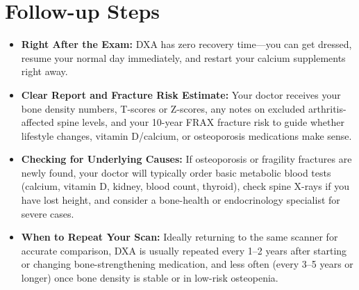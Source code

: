 \section{Follow-up Steps}
\begin{itemize}
\item \textbf{Right After the Exam:} DXA has zero recovery time---you can get dressed, resume your normal day immediately, and restart your calcium supplements right away.
\item \textbf{Clear Report and Fracture Risk Estimate:} Your doctor receives your bone density numbers, T-scores or Z-scores, any notes on excluded arthritis-affected spine levels, and your 10-year FRAX fracture risk to guide whether lifestyle changes, vitamin D/calcium, or osteoporosis medications make sense.
\item \textbf{Checking for Underlying Causes:} If osteoporosis or fragility fractures are newly found, your doctor will typically order basic metabolic blood tests (calcium, vitamin D, kidney, blood count, thyroid), check spine X-rays if you have lost height, and consider a bone-health or endocrinology specialist for severe cases.
\item \textbf{When to Repeat Your Scan:} Ideally returning to the same scanner for accurate comparison, DXA is usually repeated every 1--2 years after starting or changing bone-strengthening medication, and less often (every 3--5 years or longer) once bone density is stable or in low-risk osteopenia.
\end{itemize}

